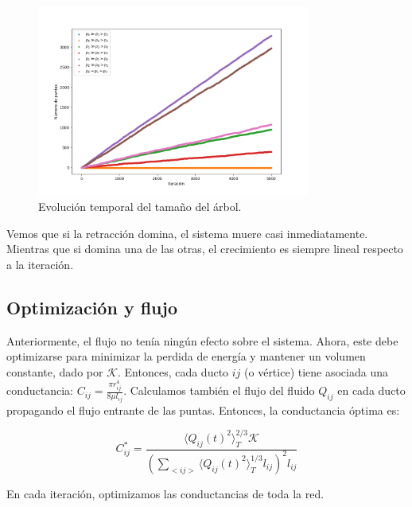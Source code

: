 \documentclass{article}
\begin{document}
\begin{figure}[h!]
    \centering
    \includegraphics[width=0.8\textwidth]{graficos_proba/N(t)_comparado.png}
    \caption{Evolución temporal del tamaño del árbol.}
    \label{fig:evolucion_tamano_proba}
\end{figure}

Vemos que si la retracción domina, el sistema muere casi inmediatamente. Mientras que si domina una de las otras, el crecimiento es siempre lineal respecto a la iteración.

\subsection{Optimización y flujo}

Anteriormente, el flujo no tenía ningún efecto sobre el sistema. Ahora, este debe optimizarse para minimizar la perdida de energía y mantener un volumen constante, dado por $\mathcal{K}$.
Entonces, cada ducto $ij$ (o vértice) tiene asociada una conductancia: $C_{ij} = \frac{\pi r_{ij}^4}{8\mu l_{ij}}$. Calculamos también el flujo del fluido $Q_{ij}$ en cada ducto propagando
el flujo entrante de las puntas. Entonces, la conductancia óptima es:

$$ C_{ij}^* = \frac{\langle Q_{ij}(t)^2\rangle_T^{2/3} \mathcal{K}}{\left( \sum_{<ij>} \langle Q_{ij}(t)^2\rangle_T^{1/3} l_{ij}\right)^2 l_{ij}} $$

En cada iteración, optimizamos las conductancias de toda la red.
\end{document}
